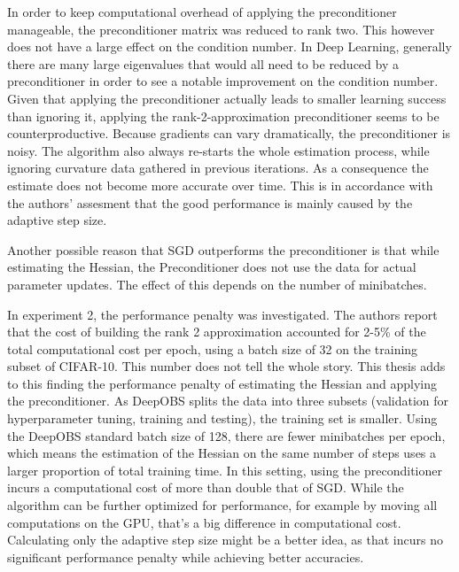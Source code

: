 \documentclass[twoside,12pt,a4paper]{report}
\begin{document}
In order to keep computational overhead of applying the preconditioner manageable, the preconditioner matrix was reduced to rank two. This however does not have a large effect on the condition number. In Deep Learning, generally there are many large eigenvalues  that would all need to be reduced by a preconditioner in order to see a notable improvement on the condition number. Given that applying the preconditioner actually leads to smaller learning success than ignoring it, applying the rank-2-approximation preconditioner seems to be counterproductive. Because gradients can vary dramatically, the preconditioner is noisy. The algorithm also always re-starts the whole estimation process, while ignoring curvature data gathered in previous iterations. As a consequence the estimate does not become more accurate over time. This is in accordance with the authors' assesment that the good performance is mainly caused by the adaptive step size.

Another possible reason that SGD outperforms the preconditioner is that while estimating the Hessian, the Preconditioner does not use the data for actual parameter updates. The effect of this depends on the number of minibatches.


In experiment 2, the performance penalty was investigated. The authors report that the cost of building the rank 2 approximation accounted for 2-5\% of the total computational cost per epoch, using a batch size of 32 on the training subset of CIFAR-10. This number does not tell the whole story. This thesis adds to this finding the performance penalty of estimating the Hessian and applying the preconditioner. As DeepOBS splits the data into three subsets (validation for hyperparameter tuning, training and testing), the training set is smaller. Using the DeepOBS standard batch size of 128, there are fewer minibatches per epoch, which means the estimation of the Hessian on the same number of steps uses a larger proportion of total training time. In this setting, using the preconditioner incurs a computational cost of more than double that of SGD. While the algorithm can be further optimized for performance, for example by moving all computations on the GPU, that's a big difference in computational cost. Calculating only the adaptive step size might be a better idea, as that incurs no significant performance penalty while achieving better accuracies.
\end{document}

